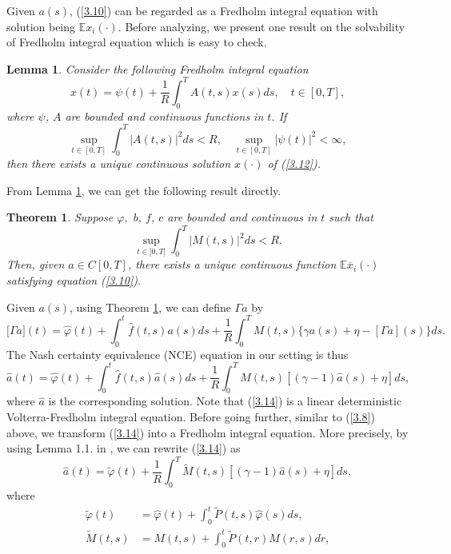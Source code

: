 \documentclass[11pt]{article}
\newtheorem{theorem}{Theorem}[section]
\newtheorem{lemma}{Lemma}[section]
\def\dbE{\mathbb{E}}
\begin{document}
%
Given $a(s)$, (\ref{3.10}) can be regarded as a Fredholm integral
equation with solution being $\dbE x_i(\cdot)$. Before analyzing,
we present one result on the solvability of Fredholm
integral equation which is easy to check.
\begin{lemma}\label{lemma-1}
Consider the following Fredholm integral equation
%
\begin{equation}\label{3.12}
x(t)=\psi (t)+\frac{1}{R}\int_{0}^{T}A(t,s)x(s)ds,\quad t\in[0,T],
\end{equation}%
%
where $\psi $, $A$ are bounded and continuous functions in $t$. If
%
\[
\sup_{t\in [0,T]}\int_{0}^{T}|A(t,s)|^{2}ds<R, \quad
\sup_{t\in [0,T]}|\psi (t)|^{2}<\infty ,
\]%
%
then there exists a unique continuous solution $x(\cdot)$ of (\ref{3.12}).
\end{lemma}
From Lemma \ref{lemma-1}, we can get the following result directly.
\begin{theorem}\label{theorem-1}
Suppose $\varphi,$ $b$, $f$, $c$ are bounded and continuous in $t$
such that
%
\[
\sup_{t\in \lbrack 0,T]}\int_{0}^{T}|M(t,s)|^{2}ds<R.
\]
%
Then, given $a\in C[0,T]$, there exists a
unique continuous function $\dbE \overline{x}_i(\cdot)$ satisfying
equation (\ref{3.10}).
\end{theorem}
Given $a(s)$, using Theorem \ref{theorem-1}, we can define $\Gamma a$
by
\begin{equation}\label{3.13}
\lbrack \Gamma a](t)=\widehat{\varphi
}(t)+\int_0^t\widehat{f}(t,s)a(s)ds
+\frac{1}{R}%
\int_{0}^{T}M(t,s)\big\{\gamma a(s)+\eta-[\Gamma a](s)\big\}ds.
\end{equation}%
The Nash certainty equivalence (NCE) equation in our setting is thus
\begin{equation}\label{3.14}
\widehat{a}(t)=\widehat{\varphi}(t)+\int_0^t\widehat{f}(t,s)
\widehat{a}(s)ds+\frac{1}{R}\int_{0}^{T}M(t,s)[(\gamma-1)\widehat{a}(s)+\eta ]ds,
\end{equation}%
where $\widehat{a}$ is the corresponding solution. Note that
(\ref{3.14}) is a linear deterministic Volterra-Fredholm integral
equation. Before going further, similar to (\ref{3.8}) above, we
transform (\ref{3.14}) into a Fredholm integral equation. More
precisely, by using Lemma 1.1. in \cite{Y 1996}, we can rewrite
(\ref{3.14}) as
%
\begin{equation}\label{3.15}
\widehat{a}(t)=\widetilde{\varphi}(t)+\frac{1}{R}\int_{0}^{T}\widetilde{M}(t,s)[(\gamma -1)\widehat{a}(s)+\eta ]ds,
\end{equation}%
%
where
%
\begin{align}\label{3.16}
\widetilde{\varphi}(t)&=\widehat{\varphi}(t)+\int_{0}^{t}\widetilde{P}(t,s)\widehat{\varphi}
(s)ds, \nonumber \\
\widetilde{M}(t,s)&=M(t,s)+\int_{0}^{t}\widetilde{P}(t,r)M(r,s)dr,
\end{align}
\end{document}
